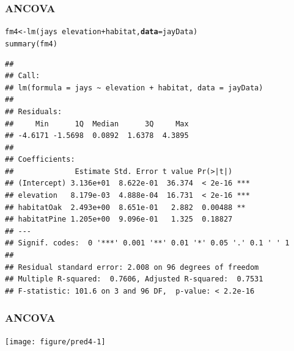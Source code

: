 \documentclass[color=usenames,dvipsnames]{beamer}\usepackage[]{graphicx}\usepackage[]{color}
\makeatletter
\newcommand{\hlopt}[1]{\textcolor[rgb]{0,0,0}{#1}}%
\newcommand{\hlstd}[1]{\textcolor[rgb]{0,0,0}{#1}}%
\newcommand{\hlkwb}[1]{\textcolor[rgb]{0,0.341,0.682}{#1}}%
\newcommand{\hlkwc}[1]{\textcolor[rgb]{0,0,0}{\textbf{#1}}}%
\newcommand{\hlkwd}[1]{\textcolor[rgb]{0.004,0.004,0.506}{#1}}%
\newenvironment{kframe}{%
 \def\at@end@of@kframe{}%
 \ifinner\ifhmode%
  \def\at@end@of@kframe{\end{minipage}}%
  \begin{minipage}{\columnwidth}%
 \fi\fi%
 \def\FrameCommand##1{\hskip\@totalleftmargin \hskip-\fboxsep
 \colorbox{shadecolor}{##1}\hskip-\fboxsep
     \hskip-\linewidth \hskip-\@totalleftmargin \hskip\columnwidth}%
 \MakeFramed {\advance\hsize-\width
   \@totalleftmargin\z@ \linewidth\hsize
   \@setminipage}}%
 {\par\unskip\endMakeFramed%
 \at@end@of@kframe}
\newenvironment{knitrout}{}{} %
\makeatother
\begin{document}
\begin{frame}[fragile]
  \frametitle{ANCOVA}
\begin{knitrout}\scriptsize
{}\color{fgcolor}\begin{kframe}
\begin{alltt}
\hlstd{fm4} \hlkwb{<-} \hlkwd{lm}\hlstd{(jays} \hlopt{~} \hlstd{elevation}\hlopt{+}\hlstd{habitat,} \hlkwc{data}\hlstd{=jayData)}
\hlkwd{summary}\hlstd{(fm4)}
\end{alltt}
\begin{verbatim}
## 
## Call:
## lm(formula = jays ~ elevation + habitat, data = jayData)
## 
## Residuals:
##     Min      1Q  Median      3Q     Max 
## -4.6171 -1.5698  0.0892  1.6378  4.3895 
## 
## Coefficients:
##              Estimate Std. Error t value Pr(>|t|)    
## (Intercept) 3.136e+01  8.622e-01  36.374  < 2e-16 ***
## elevation   8.179e-03  4.888e-04  16.731  < 2e-16 ***
## habitatOak  2.493e+00  8.651e-01   2.882  0.00488 ** 
## habitatPine 1.205e+00  9.096e-01   1.325  0.18827    
## ---
## Signif. codes:  0 '***' 0.001 '**' 0.01 '*' 0.05 '.' 0.1 ' ' 1
## 
## Residual standard error: 2.008 on 96 degrees of freedom
## Multiple R-squared:  0.7606,	Adjusted R-squared:  0.7531 
## F-statistic: 101.6 on 3 and 96 DF,  p-value: < 2.2e-16
\end{verbatim}
\end{kframe}
\end{knitrout}
\end{frame}



\begin{frame}[fragile]
  \frametitle{ANCOVA}
\begin{knitrout}
\color{fgcolor}
\texttt{[image: figure/pred4-1]} 

\end{knitrout}
\end{frame}
\end{document}
